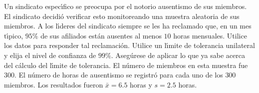 \begin{enunciado}
 Un sindicato espec\'{\i}fico se preocupa por el notorio ausentismo de sus miembros. El sindicato decidi\'o verificar esto monitoreando una muestra aleatoria de sus miembros. A los l\'{\i}deres del sindicato siempre se les ha reclamado que, en un mes t\'{\i}pico, $95\%$ de sus afiliados est\'an ausentes al menos $10$ horas mensuales. Utilice los datos para responder tal reclamaci\'on. Utilice un l\'{\i}mite de tolerancia unilateral y elija el nivel de confianza de $99\%$. Aseg\'urese de aplicar lo que ya sabe acerca del c\'alculo del l\'{\i}mite de tolerancia. El n\'umero de miembros en esta muestra fue $300$. El n\'umero de horas de ausentismo se registr\'o para cada uno de los $300$ miembros. Los resultados fueron $\bar{x} = 6.5$ horas y $s = 2.5$ horas.
\end{enunciado}

